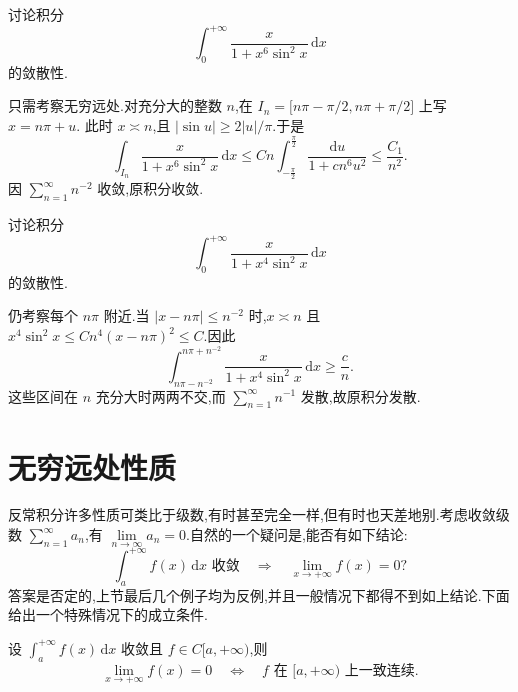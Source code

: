 \begin{example}[\markstar]
  讨论积分
  \[
    \displaystyle\int_0^{+\infty}\dfrac{x}{1+x^6\sin^2x}\,\mathrm{d}x
  \]
  的敛散性.
\end{example}
\exampleblank

\begin{solution}
  只需考察无穷远处.对充分大的整数 $n$,在
  $I_n=\lbrack n\pi-\pi/2,n\pi+\pi/2\rbrack$ 上写 $x=n\pi+u$.
  此时 $x\asymp n$,且 $|\sin u|\geq2|u|/\pi$.于是
  \[
    \displaystyle\int_{I_n}\dfrac{x}{1+x^6\sin^2x}\,\mathrm{d}x
    \leq Cn\int_{-\frac{\pi}{2}}^{\frac{\pi}{2}}
    \dfrac{\mathrm{d}u}{1+c n^6u^2}
    \leq\dfrac{C_1}{n^2}.
  \]
  因 $\displaystyle\sum\limits_{n=1}^{\infty}n^{-2}$ 收敛,原积分收敛.
\end{solution}

\begin{example}[\markstar]
  讨论积分
  \[
    \displaystyle\int_0^{+\infty}\dfrac{x}{1+x^4\sin^2x}\,\mathrm{d}x
  \]
  的敛散性.
\end{example}
\exampleblank

\begin{solution}
  仍考察每个 $n\pi$ 附近.当
  $|x-n\pi|\leq n^{-2}$ 时,$x\asymp n$ 且
  $x^4\sin^2x\leq Cn^4(x-n\pi)^2\leq C$.因此
  \[
    \displaystyle\int_{n\pi-n^{-2}}^{n\pi+n^{-2}}
    \dfrac{x}{1+x^4\sin^2x}\,\mathrm{d}x
    \geq\dfrac{c}{n}.
  \]
  这些区间在 $n$ 充分大时两两不交,而
  $\displaystyle\sum\limits_{n=1}^{\infty}n^{-1}$ 发散,故原积分发散.
\end{solution}


\newpage

\section{无穷远处性质}

反常积分许多性质可类比于级数,有时甚至完全一样,但有时也天差地别.考虑收敛级数 $\displaystyle\sum\limits_{n=1}^{\infty}a_n$,有 $\displaystyle\lim\limits_{n\to\infty}a_n=0$.自然的一个疑问是,能否有如下结论:
\[
  \displaystyle\int_a^{+\infty}f(x)\,\mathrm{d}x\text{ 收敛}
  \quad\Longrightarrow\quad
  \lim\limits_{x\to+\infty}f(x)=0?
\]
答案是否定的,上节最后几个例子均为反例,并且一般情况下都得不到如上结论.下面给出一个特殊情况下的成立条件.

\begin{proposition}[\markstar]
  设 $\displaystyle\int_a^{+\infty}f(x)\,\mathrm{d}x$ 收敛且 $f\in C\lbrack a,+\infty)$,则
  \[
    \displaystyle\lim\limits_{x\to+\infty}f(x)=0
    \quad\Longleftrightarrow\quad
    f\text{ 在 }\lbrack a,+\infty)\text{ 上一致连续}.
  \]
\end{proposition}

